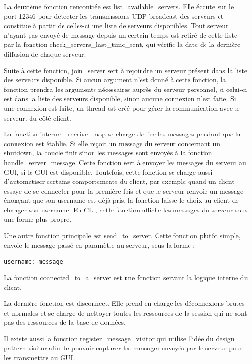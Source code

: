 \documentclass[11pt]{article}
\begin{document}
La deuxième fonction rencontrée est list\_available\_servers. Elle écoute sur le port 12346 pour détecter les transmissions UDP broadcast des serveurs et constitue à partir de celles-ci une liste de serveurs disponibles. 
Tout serveur n’ayant pas envoyé de message depuis un certain temps est retiré de cette liste par la fonction check\_servers\_last\_time\_sent, qui vérifie la date de la dernière diffusion de chaque serveur.

Suite à cette fonction, join\_server sert à rejoindre un serveur présent dans la liste des serveurs disponible. 
Si aucun argument n’est donné à cette fonction, la fonction prendra les arguments nécessaires auprès du serveur personnel, si celui-ci est dans la liste des serveurs disponible, sinon aucune connexion n’est faite. 
Si une connexion est faite, un thread est créé pour gérer la communication avec le serveur, du côté client.

La fonction interne \_receive\_loop se charge de lire les messages pendant que la connexion est établie. 
Si elle reçoit un message du serveur concernant un shutdown, la boucle finit sinon les messages sont envoyés à la fonction handle\_server\_message.
Cette fonction sert à envoyer les messages du serveur au GUI, si le GUI est disponible.
Toutefois, cette fonction se charge aussi d’automatiser certains comportements du client, par exemple quand un client essaye de se connecter pour la première fois et que le serveur renvoie un message énonçant que son username est déjà pris, la fonction laisse le choix au client de changer son username. 
En CLI, cette fonction affiche les messages du serveur sous une forme plus propre.

Une autre fonction principale est send\_to\_server. Cette fonction plutôt simple, envoie le message passé en paramètre au serveur, sous la forme :

\begin{center}
    \texttt{username: message}
\end{center}

La fonction connected\_to\_a\_server est une fonction servant la logique interne du client.

La dernière fonction est disconnect. Elle prend en charge les déconnexions brutes et normales et se charge de nettoyer toutes les ressources de la session qui ne sont pas des ressources de la base de données.

Il existe aussi la fonction register\_message\_visitor qui utilise l’idée du design pattern visitor afin de pouvoir capturer les messages envoyés par le serveur pour les transmettre au GUI.
\end{document}
